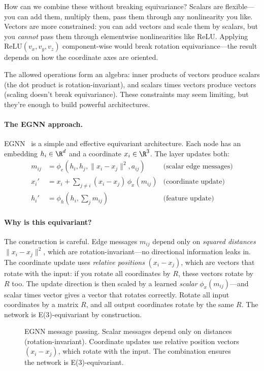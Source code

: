 \documentclass[11pt]{article}
\begin{document}
How can we combine these without breaking equivariance? Scalars are flexible---you can add them, multiply them, pass them through any nonlinearity you like. Vectors are more constrained: you can add vectors and scale them by scalars, but you \emph{cannot} pass them through elementwise nonlinearities like ReLU. Applying $\text{ReLU}(v_x, v_y, v_z)$ component-wise would break rotation equivariance---the result depends on how the coordinate axes are oriented.

The allowed operations form an algebra: inner products of vectors produce scalars (the dot product is rotation-invariant), and scalars times vectors produce vectors (scaling doesn't break equivariance). These constraints may seem limiting, but they're enough to build powerful architectures.

\paragraph{The EGNN approach.} EGNN~\cite{satorras2021egnn} is a simple and effective equivariant architecture. Each node has an embedding $h_i \in \R^d$ and a coordinate $x_i \in \R^3$. The layer updates both:
\begin{align}
m_{ij} &= \phi_e(h_i, h_j, \|x_i - x_j\|^2, a_{ij}) & \text{(scalar edge messages)} \\
x_i' &= x_i + \sum_{j \neq i} (x_i - x_j) \, \phi_x(m_{ij}) & \text{(coordinate update)} \\
h_i' &= \phi_h\left(h_i, \sum_j m_{ij}\right) & \text{(feature update)}
\end{align}

\paragraph{Why is this equivariant?} The construction is careful. Edge messages $m_{ij}$ depend only on \emph{squared distances} $\|x_i - x_j\|^2$, which are rotation-invariant---no directional information leaks in. The coordinate update uses \emph{relative positions} $(x_i - x_j)$, which are vectors that rotate with the input: if you rotate all coordinates by $R$, these vectors rotate by $R$ too. The update direction is then scaled by a learned \emph{scalar} $\phi_x(m_{ij})$---and scalar times vector gives a vector that rotates correctly.
%
Rotate all input coordinates by a matrix $R$, and all output coordinates rotate by the same $R$. The network is E(3)-equivariant by construction.

\begin{figure}[h]
\centering

\caption{EGNN message passing. Scalar messages depend only on distances (rotation-invariant). Coordinate updates use relative position vectors $(x_i - x_j)$, which rotate with the input. The combination ensures the network is E(3)-equivariant.}
\label{fig:egnn}
\end{figure}
\end{document}
